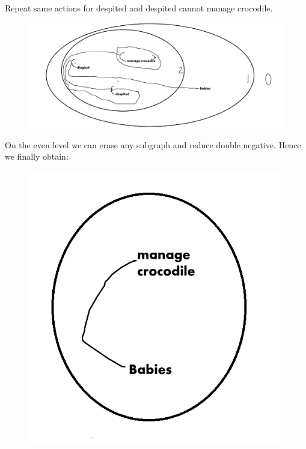 \documentclass[12pt]{report}
\begin{document}
    Repeat same actions for despited and despited cannot manage crocodile. 
    \begin{figure}[H]
        \center
        \includegraphics[scale=0.8]{p5a_4.png}
    \end{figure}
    On the even level we can erase any subgraph and reduce double negative. Hence we finally obtain:
    \begin{figure}[H]
        \center
        \includegraphics[scale=0.8]{p5a_5.png}
    \end{figure}
\end{document}
